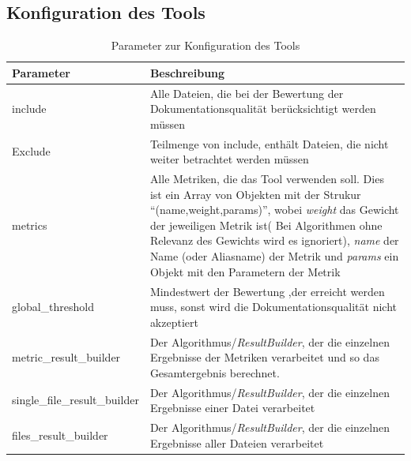\begin{appendices}
\chapter{Konfiguration des Tools}
\begin{table}[h]
    \centering
    \begin{tabular}{m{4cm}|m{11cm}}
    \hline
        Parameter & Beschreibung  \\
        \hline
        include & Alle Dateien, die bei der Bewertung der Dokumentationsqualität berücksichtigt werden müssen\\
        \hline
        Exclude & Teilmenge von include, enthält Dateien, die nicht weiter betrachtet werden müssen\\
        \hline
        metrics & Alle Metriken, die das Tool verwenden soll. Dies ist ein Array von Objekten mit der Strukur \enquote{(name,weight,params)}, wobei \textit{weight} das Gewicht der jeweiligen Metrik ist( Bei Algorithmen ohne Relevanz des Gewichts wird es ignoriert), \textit{name} der Name (oder Aliasname) der Metrik und \textit{params} ein Objekt mit den Parametern der Metrik\\\hline
        global\_threshold & Mindestwert der Bewertung ,der erreicht werden muss, sonst wird die Dokumentationsqualität nicht akzeptiert\\\hline
        metric\_result\_builder & Der Algorithmus/\textit{ResultBuilder}, der die einzelnen Ergebnisse der Metriken verarbeitet und so das Gesamtergebnis berechnet.\\\hline
          single\_file\_result\_builder & Der Algorithmus/\textit{ResultBuilder}, der die einzelnen Ergebnisse einer Datei verarbeitet\\\hline
        files\_result\_builder & Der Algorithmus/\textit{ResultBuilder}, der die einzelnen Ergebnisse aller Dateien verarbeitet
        
    \end{tabular}
    \caption{Parameter zur Konfiguration des Tools}
    \label{tab:tool_javadoc_conf}
\end{table}

\end{appendices}

